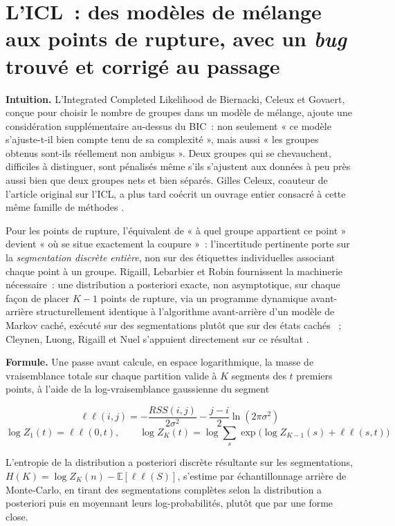 \documentclass[11pt]{article}
\begin{document}
\section{L'ICL~: des modèles de mélange aux points de rupture, avec un \emph{bug} trouvé et corrigé au passage}
\label{sec:icl}

\textbf{Intuition.} L'Integrated Completed Likelihood de Biernacki, Celeux
et Govaert, conçue pour choisir le nombre de groupes dans un modèle de
mélange, ajoute une considération supplémentaire au-dessus du BIC~: non
seulement « ce modèle s'ajuste-t-il bien compte tenu de sa complexité »,
mais aussi « les groupes obtenus sont-ils réellement non ambigus ». Deux
groupes qui se chevauchent, difficiles à distinguer, sont pénalisés même
s'ils s'ajustent aux données à peu près aussi bien que deux groupes nets et
bien séparés. Gilles Celeux, coauteur de l'article original sur l'ICL, a
plus tard coécrit un ouvrage entier consacré à cette même famille de
méthodes \citep{bouveyron2021mbc}.

Pour les points de rupture, l'équivalent de « à quel groupe appartient ce
point » devient « où se situe exactement la coupure »~: l'incertitude
pertinente porte sur la \emph{segmentation discrète entière}, non sur des
étiquettes individuelles associant chaque point à un groupe. Rigaill,
Lebarbier et Robin fournissent la machinerie nécessaire~: une distribution
a posteriori exacte, non asymptotique, sur chaque façon de placer $K-1$
points de rupture, via un programme dynamique avant-arrière
structurellement identique à l'algorithme avant-arrière d'un modèle de
Markov caché, exécuté sur des segmentations plutôt que sur des états
cachés \citeyearpar{rigaill2012}~; Cleynen, Luong, Rigaill et Nuel
s'appuient directement sur ce résultat \citeyearpar{cleynen2013}.

\textbf{Formule.} Une passe avant calcule, en espace logarithmique, la
masse de vraisemblance totale sur chaque partition valide à $K$ segments
des $t$ premiers points, à l'aide de la log-vraisemblance gaussienne du
segment

\begin{equation}
\ell\ell(i, j) = -\frac{RSS(i, j)}{2\sigma^2} - \frac{j - i}{2} \ln(2\pi\sigma^2)
\end{equation}
\begin{equation}
\log Z_1(t) = \ell\ell(0, t), \qquad \log Z_K(t) = \log \sum_{s} \exp\!\Big( \log Z_{K-1}(s) + \ell\ell(s, t) \Big)
\end{equation}

L'entropie de la distribution a posteriori discrète résultante sur les
segmentations, $H(K) = \log Z_K(n) - \mathbb{E}[\ell\ell(S)]$, s'estime par
échantillonnage arrière de Monte-Carlo, en tirant des segmentations
complètes selon la distribution a posteriori puis en moyennant leurs
log-probabilités, plutôt que par une forme close.
\end{document}
